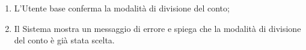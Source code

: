 \begin{itemize}
\begin{itemize}
\begin{enumerate}
					\item L'Utente base conferma la modalità di divisione del conto;
	
					\item Il Sistema mostra un messaggio di errore e spiega che la
						modalità di divisione del conto è già stata scelta.
				\end{enumerate}
		  \end{itemize}

\end{itemize}

